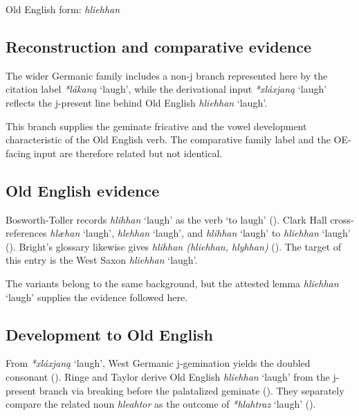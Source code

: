 \documentclass[
  british,
  a4paper,
  openany]{book}
\providecommand{\Recon}[1]{\emph{*#1}}
{\catcode`→=\active \global\def→{\ensuremath{\rightarrow}}}
\providecommand{\Recon}[1]{\emph{*#1}}
{\catcode`→=\active \global\def→{\ensuremath{\rightarrow}}}
\begin{document}
Old English form: \emph{hliehhan}

\subsection{Reconstruction and comparative
evidence}\label{reconstruction-and-comparative-evidence-86}

The wider Germanic family includes a non-j branch represented here by
the citation label \Recon{lákaną} `laugh', while the derivational input
\Recon{xláxjaną} `laugh' reflects the j-present line behind Old English
{\emph{hliehhan}} `laugh'.

This branch supplies the geminate fricative and the vowel development
characteristic of the Old English verb. The comparative family label and
the OE-facing input are therefore related but not identical.

\subsection{Old English evidence}\label{old-english-evidence-86}

Bosworth-Toller records {\emph{hlihhan}} `laugh' as the verb `to laugh'
().
Clark Hall cross-references \emph{hlæhan} `laugh', \emph{hlehhan}
`laugh', and \emph{hlihhan} `laugh' to {\emph{hliehhan}} `laugh'
(). Bright's
glossary likewise gives \emph{hlihhan (hliehhan, hlyhhan)}
(). The target
of this entry is the West Saxon {\emph{hliehhan}} `laugh'.

The variants belong to the same background, but the attested lemma
{\emph{hliehhan}} `laugh' supplies the evidence followed here.

\subsection{Development to Old
English}\label{development-to-old-english-86}

From \Recon{xláxjaną} `laugh', West Germanic j-gemination yields the
doubled consonant (). Ringe and Taylor derive Old English {\emph{hliehhan}} `laugh'
from the j-present branch via breaking before the palatalized geminate
(). They
separately compare the related noun \emph{hleahtor} as the outcome of
\Recon{hlahtraz} `laugh' ().
\end{document}
